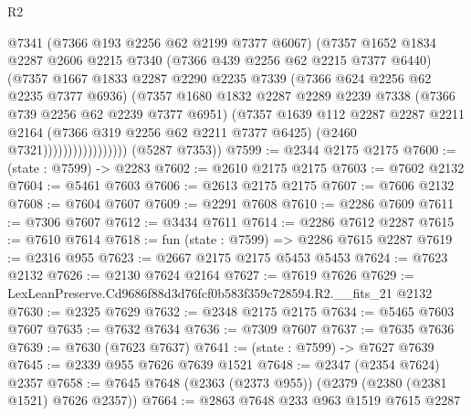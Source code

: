 \begin{lexlean}{R2}
\begin{coremodule}
                              @7341
                              (@7366 @193 @2256 @62 @2199 @7377 @6067)
                              (@7357
                                @1652
                                @1834
                                @2287
                                @2606
                                @2215
                                @7340
                                (@7366 @439 @2256 @62 @2215 @7377 @6440)
                                (@7357
                                  @1667
                                  @1833
                                  @2287
                                  @2290
                                  @2235
                                  @7339
                                  (@7366 @624 @2256 @62 @2235 @7377 @6936)
                                  (@7357
                                    @1680
                                    @1832
                                    @2287
                                    @2289
                                    @2239
                                    @7338
                                    (@7366 @739 @2256 @62 @2239 @7377 @6951)
                                    (@7357
                                      @1639
                                      @112
                                      @2287
                                      @2287
                                      @2211
                                      @2164
                                      (@7366 @319 @2256 @62 @2211 @7377 @6425)
                                      (@2460 @7321)))))))))))))))))
      (@5287 @7353))
@7599 := @2344 @2175 @2175
@7600 := (state : @7599) -> @2283
@7602 := @2610 @2175 @2175
@7603 := @7602 @2132
@7604 := @5461 @7603
@7606 := @2613 @2175 @2175
@7607 := @7606 @2132
@7608 := @7604 @7607
@7609 := @2291 @7608
@7610 := @2286 @7609
@7611 := @7306 @7607
@7612 := @3434 @7611
@7614 := @2286 @7612 @2287
@7615 := @7610 @7614
@7618 := fun (state : @7599) => @2286 @7615 @2287
@7619 := @2316 @955
@7623 := @2667 @2175 @2175 @5453 @5453
@7624 := @7623 @2132
@7626 := @2130 @7624 @2164
@7627 := @7619 @7626
@7629 := LexLeanPreserve.Cd9686f88d3d76fcf0b583f359c728594.R2.__fits_21 @2132
@7630 := @2325 @7629
@7632 := @2348 @2175 @2175
@7634 := @5465 @7603 @7607
@7635 := @7632 @7634
@7636 := @7309 @7607
@7637 := @7635 @7636
@7639 := @7630 (@7623 @7637)
@7641 := (state : @7599) -> @7627 @7639
@7645 := @2339 @955 @7626 @7639 @1521
@7648 := @2347 (@2354 @7624) @2357
@7658 := @7645 @7648 (@2363 (@2373 @955)) (@2379 (@2380 (@2381 @1521) @7626 @2357))
@7664 := @2863 @7648 @233 @963 @1519 @7615 @2287

\end{coremodule}
\end{lexlean}
